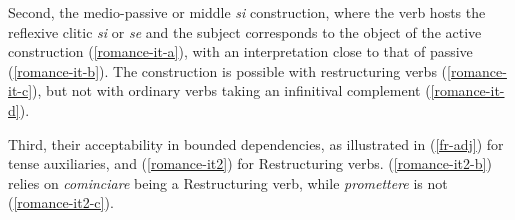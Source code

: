 \documentclass[output=paper]{langsci/langscibook}
\begin{document}
Second, the medio-passive or middle \textit{si} construction, where the verb hosts the reflexive clitic \textit{si}  or \textit{se}  and the subject corresponds to the object of the active construction (\ref{romance-it-a}), with an interpretation close to that of passive (\ref{romance-it-b}). The construction is possible with restructuring verbs (\ref{romance-it-c}), but not with ordinary verbs taking an infinitival complement (\ref{romance-it-d}).


\begin{exe}
	\ex  \label{romance-it}
	
	\begin{xlist}
		
		 \label{romance-it-a}
		
		
		 \label{romance-it-b}
		
		
		 \label{romance-it-c} 
		
		 \label{romance-it-d} 																		
	\end{xlist}
	
\end{exe}

Third, their acceptability in bounded dependencies, as illustrated in (\ref{fr-adj}) for tense auxiliaries, and (\ref{romance-it2}) for Restructuring verbs.  (\ref{romance-it2-b}) relies on \textit{cominciare} being a Restructuring verb, while \textit{promettere} is not (\ref{romance-it2-c}).  



\begin{exe}
	\ex  \label{romance-it2}
	
	\begin{xlist}
		
		 \label{romance-it2-a}
		
		 \label{romance-it2-b}
		
		  \label{romance-it2-c}
		
		
	\end{xlist}
	
\end{exe}
\end{document}

